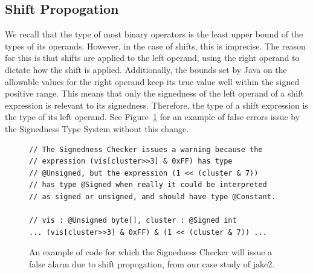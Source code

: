 \subsection{Shift Propogation}
We recall that the type of most binary operators is the least upper bound of
the types of its operands.
However, in the case of shifts, this is imprecise.
The reason for this is that shifts are applied to the left operand, using the
right operand to dictate how the shift is applied. Additionally, the bounds
set by Java on the allowable values for the right operand keep its true value
well within the signed positive range. This means that only the signedness
of the left operand of a shift expression is relevant to its signedness.
Therefore, the type of a shift expression is the type of its left operand. See
Figure~\ref{fig:shiftpropo} for an example of false errors issue by the
Signedness Type System without this change.

\begin{figure}
\begin{lstlisting}
// The Signedness Checker issues a warning because the
// expression (vis[cluster>>3] & 0xFF) has type
// @Unsigned, but the expression (1 << (cluster & 7))
// has type @Signed when really it could be interpreted
// as signed or unsigned, and should have type @Constant.

// vis : @Unsigned byte[], cluster : @Signed int
... (vis[cluster>>3] & 0xFF) & (1 << (cluster & 7)) ...
\end{lstlisting}
\caption{An example of code for which the Signedness Checker will issue a false
alarm due to shift propogation, from our case study of jake2.}
\label{fig:shiftpropo}
\end{figure}

